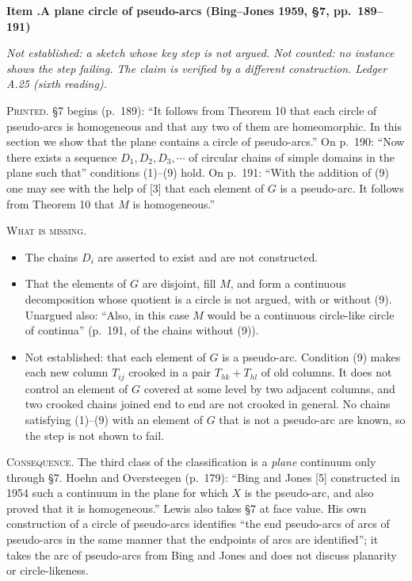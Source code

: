 \documentclass[11pt]{article}
\newcounter{defect}
\newenvironment{defect}[4]{%
  \par\addvspace{10pt}\refstepcounter{defect}%
  \noindent\textbf{Item \thedefect.\enspace #1}\par\nopagebreak
  \noindent\textit{#2}\par\nopagebreak\smallskip}{\par\addvspace{6pt}}
\newcommand{\fld}[1]{\par\noindent\textsc{#1.}\enspace}
\begin{document}
\begin{defect}{A plane circle of pseudo-arcs (Bing--Jones 1959, \S7, pp.~189--191)}{Not
established: a sketch whose key step is not argued. Not counted: no instance shows the step
failing. The claim is verified by a different construction. Ledger A.25 (sixth reading).}{0}{0}\label{it:bj7}

\fld{Printed} \S7 begins (p.~189): ``It follows from Theorem 10 that each circle of pseudo-arcs
is homogeneous and that any two of them are homeomorphic. In this section we show that the plane
contains a circle of pseudo-arcs.'' On p.~190: ``Now there exists a sequence $D_1, D_2, D_3,\cdots$ of circular chains
of simple domains in the plane such that'' conditions (1)--(9) hold. On p.~191: ``With the
addition of (9) one may see with the help of [3] that each element of $G$ is a pseudo-arc. It
follows from Theorem 10 that $M$ is homogeneous.''

\fld{What is missing}
\begin{itemize}
\item The chains $D_i$ are asserted to exist and are not constructed.
\item That the elements of $G$ are disjoint, fill $M$, and form a continuous decomposition whose
  quotient is a circle is not argued, with or without (9). Unargued also: ``Also, in this case $M$
  would be a continuous circle-like circle of continua'' (p.~191, of the chains without (9)).
\item Not established: that each element of $G$ is a pseudo-arc. Condition (9) makes each new
  column $T_{ij}$ crooked in a pair $T_{hk}+T_{hl}$ of old columns. It does not control an
  element of $G$ covered at some level by two adjacent columns, and two crooked chains joined end
  to end are not crooked in general. No chains satisfying (1)--(9) with an element of $G$ that is
  not a pseudo-arc are known, so the step is not shown to fail.
\end{itemize}

\fld{Consequence} The third class of the classification is a \emph{plane} continuum only through
\S7. Hoehn and Oversteegen (p.~179): ``Bing and Jones [5] constructed in 1954 such a continuum in
the plane for which $X$ is the pseudo-arc, and also proved that it is homogeneous.'' Lewis
\cite[p.~91]{Lw85} also takes \S7 at face value. His own construction of a circle of pseudo-arcs
\cite[p.~93]{Lw85} identifies ``the end pseudo-arcs of arcs of pseudo-arcs in the same manner that
the endpoints of arcs are identified''; it takes the arc of pseudo-arcs from Bing and Jones and does
not discuss planarity or circle-likeness.


\end{defect}
\end{document}

